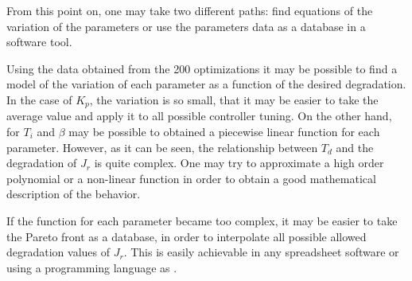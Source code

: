 From this point on, one may take two different paths: find equations of the variation of the parameters or use the parameters data as a database in a software tool.

Using the data obtained from the 200 optimizations it may be possible to find a model of the variation of each parameter as a function of the desired degradation. In the case of $K_p$, the variation is so small, that it may be easier to take the average value and apply it to all possible controller tuning. On the other hand, for $T_i$ and $\beta$ may be possible to obtained a piecewise linear function for each parameter. However, as it can be seen, the relationship between $T_d$ and the degradation of $J_r$ is quite complex. One may try to approximate a high order polynomial or a non-linear function in order to obtain a good mathematical description of the behavior.

If the function for each parameter became too complex, it may be easier to take the Pareto front as a database, in order to interpolate all possible allowed degradation values of $J_r$. This is easily achievable in any spreadsheet software or using a programming language as \matlab.

